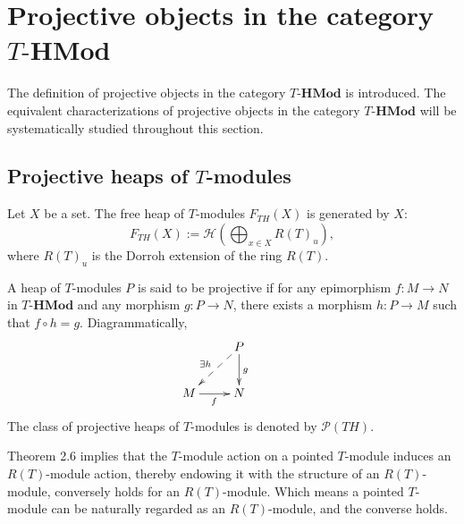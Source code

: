 \documentclass[11pt, twoside]{article}
\begin{document}
\section{Projective objects in the category $T\textbf{-HMod}$}

The definition of projective objects in the category $T\textbf{-HMod}$ is introduced. The  equivalent characterizations of projective objects in the category $T\textbf{-HMod}$ will be systematically studied throughout this section.


\subsection{Projective heaps of $T$-modules}


\begin{definition}
Let $X$ be a set. The free heap of $T$-modules $F_{TH}(X)$ is generated by $X$:
$$F_{TH}(X):=\mathcal{H}(\bigoplus_{x\in X}R(T)_u),$$
where $R(T)_u$ is the Dorroh extension of the ring $R(T)$.
\end{definition}

\begin{definition}
A heap of $T$-modules $P$ is said to be projective if for any epimorphism $f:M\rightarrow N$ in $T\textbf{-HMod}$ and any morphism $g:P\rightarrow N$, there exists a morphism $h:P\rightarrow M$ such that $f\circ h=g$. Diagrammatically,
$$ \xymatrix{ & P \ar@{-->}[dl]_{\exists h} \ar[d]^{g} & \\
M \ar[r]_{f} & N } $$
The class of projective heaps of $T$-modules is denoted by $\mathcal{P}(TH)$.
\end{definition}

\begin{remark}
Theorem 2.6 implies that the $T$-module action on a pointed $T$-module induces an $R(T)$-module action, thereby endowing it with the structure of an $R(T)$-module, conversely holds for an $R(T)$-module. Which means a pointed $T$-module can be naturally regarded as an $R(T)$-module, and the converse holds.
\end{remark}
\end{document}

